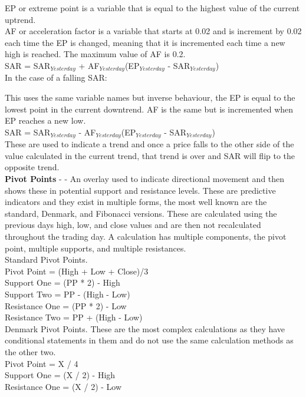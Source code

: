 \documentclass[conference]{IEEEtran}
\begin{document}
\noindent
EP or extreme point is a variable that is equal to the highest value of the current uptrend.\\
AF or acceleration factor is a variable that starts at 0.02 and is increment by 0.02 each time the EP is changed, meaning that it is incremented each time a new high is reached. The maximum value of AF is 0.2. \\

\noindent
SAR = SAR$_{Yesterday}$ + AF$_{Yesterday}$(EP$_{Yesterday}$ - SAR$_{Yesterday}$) \\

\noindent
In the case of a falling SAR:

\noindent
This uses the same variable names but inverse behaviour, the EP is equal to the lowest point in the current downtrend. AF is the same but is incremented when EP reaches a new low. \\

\noindent
SAR = SAR$_{Yesterday}$ - AF$_{Yesterday}$(EP$_{Yesterday}$ - SAR$_{Yesterday}$) \\

\noindent
These are used to indicate a trend and once a price falls to the other side of the value calculated in the current trend, that trend is over and SAR will flip to the opposite trend. \\

\noindent
\textbf{Pivot Points} - \cite{Murphy1999} - An overlay used to indicate directional movement and then shows these in potential support and resistance levels. These are predictive indicators and they exist in multiple forms, the most well known are the standard, Denmark, and Fibonacci versions. These are calculated using the previous days high, low, and close values and are then not recalculated throughout the trading day. A calculation has multiple components, the pivot point, multiple supports, and multiple resistances.\\

\noindent
Standard Pivot Points. \\
Pivot Point = (High + Low + Close)/3\\
Support One = (PP * 2) - High\\
Support Two = PP - (High - Low)\\
Resistance One = (PP * 2) - Low\\
Resistance Two = PP + (High - Low)\\

\noindent
Denmark Pivot Points. These are the most complex calculations as they have conditional statements in them and do not use the same calculation methods as the other two.\\
Pivot Point = X / 4\\
Support One = (X / 2) - High\\
Resistance One = (X / 2) - Low\\
\end{document}
